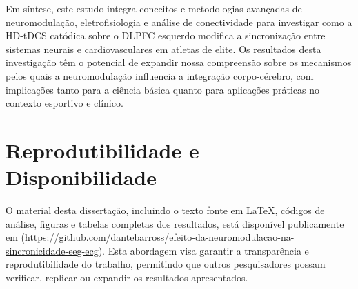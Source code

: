 Em síntese, este estudo integra conceitos e metodologias avançadas de neuromodulação, eletrofisiologia e análise de conectividade para investigar como a HD-tDCS catódica sobre o DLPFC esquerdo modifica a sincronização entre sistemas neurais e cardiovasculares em atletas de elite. Os resultados desta investigação têm o potencial de expandir nossa compreensão sobre os mecanismos pelos quais a neuromodulação influencia a integração corpo-cérebro, com implicações tanto para a ciência básica quanto para aplicações práticas no contexto esportivo e clínico.

\section{Reprodutibilidade e Disponibilidade}
O material desta dissertação, incluindo o texto fonte em \LaTeX, códigos de análise, figuras e tabelas completas dos resultados, está disponível publicamente em \cite{barros2025repository} (\url{https://github.com/dantebarross/efeito-da-neuromodulacao-na-sincronicidade-eeg-ecg}). Esta abordagem visa garantir a transparência e reprodutibilidade do trabalho, permitindo que outros pesquisadores possam verificar, replicar ou expandir os resultados apresentados.
